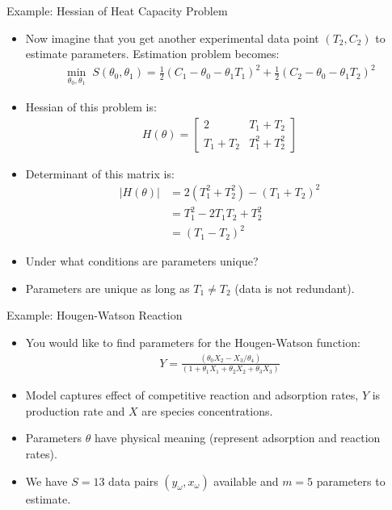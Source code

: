\documentclass[9pt]{beamer}
\begin{document}
%
\begin{frame}{Example: Hessian of Heat Capacity Problem}

\begin{itemize}
\item Now imagine that you get another experimental data point $(T_2,C_2)$ to estimate parameters. Estimation problem becomes: 
\begin{align*}
\min_{\theta_0,\theta_1} \; S(\theta_0,\theta_1)=\frac{1}{2}(C_1-\theta_0-\theta_1T_1)^2+\frac{1}{2}(C_2-\theta_0-\theta_1T_2)^2
\end{align*}
\item Hessian of this problem is:
\begin{align*}
H(\theta)=\left[\begin{array}{cc}2&T_1+T_2\\ T_1+T_2 & T_1^2+T_2^2\end{array}\right]
\end{align*}
\item Determinant of this matrix is:
\begin{align*}
|H(\theta)|&=2(T_1^2+T_2^2)-(T_1+T_2)^2\\
&=T_1^2-2T_1T_2+T_2^2\\
&=(T_1-T_2)^2
\end{align*}
\item Under what conditions are parameters unique? 
\pause
\item Parameters are unique as long as $T_1\neq T_2$ (data is not redundant). 
\end{itemize}

\end{frame}


%
\begin{frame}{Example: Hougen-Watson Reaction}

\begin{itemize}
\item You would like to find parameters for the Hougen-Watson function:
\begin{align*}
Y=\frac{(\theta_0X_2-X_3/\theta_4)}{(1+\theta_1X_1+\theta_2X_2+\theta_3X_3)}
\end{align*}
\item Model captures effect of competitive reaction and adsorption rates, $Y$ is production rate and $X$ are species concentrations. 
\item Parameters $\theta$ have physical meaning (represent adsorption and reaction rates). 
\item We have $S=13$ data pairs $(y_\omega,x_\omega)$ available and $m=5$ parameters to estimate. 
\end{itemize}


\end{frame}
\end{document}
